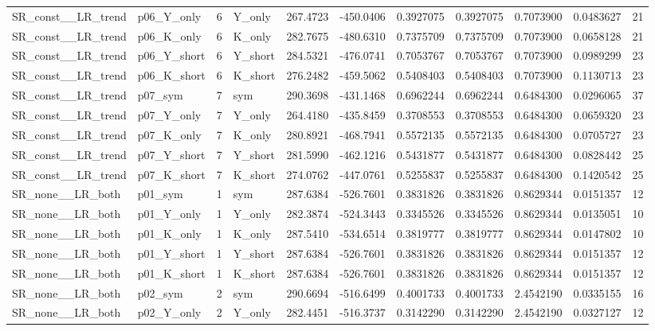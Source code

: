 \begin{table}[!h]
\begin{tabular}[t]{llrlrrrrrrr}
SR\_const\_\_LR\_trend & p06\_Y\_only & 6 & Y\_only & 267.4723 & -450.0406 & 0.3927075 & 0.3927075 & 0.7073900 & 0.0483627 & 21\\
SR\_const\_\_LR\_trend & p06\_K\_only & 6 & K\_only & 282.7675 & -480.6310 & 0.7375709 & 0.7375709 & 0.7073900 & 0.0658128 & 21\\
SR\_const\_\_LR\_trend & p06\_Y\_short & 6 & Y\_short & 284.5321 & -476.0741 & 0.7053767 & 0.7053767 & 0.7073900 & 0.0989299 & 23\\
SR\_const\_\_LR\_trend & p06\_K\_short & 6 & K\_short & 276.2482 & -459.5062 & 0.5408403 & 0.5408403 & 0.7073900 & 0.1130713 & 23\\
\addlinespace
SR\_const\_\_LR\_trend & p07\_sym & 7 & sym & 290.3698 & -431.1468 & 0.6962244 & 0.6962244 & 0.6484300 & 0.0296065 & 37\\
SR\_const\_\_LR\_trend & p07\_Y\_only & 7 & Y\_only & 264.4180 & -435.8459 & 0.3708553 & 0.3708553 & 0.6484300 & 0.0659320 & 23\\
SR\_const\_\_LR\_trend & p07\_K\_only & 7 & K\_only & 280.8921 & -468.7941 & 0.5572135 & 0.5572135 & 0.6484300 & 0.0705727 & 23\\
SR\_const\_\_LR\_trend & p07\_Y\_short & 7 & Y\_short & 281.5990 & -462.1216 & 0.5431877 & 0.5431877 & 0.6484300 & 0.0828442 & 25\\
SR\_const\_\_LR\_trend & p07\_K\_short & 7 & K\_short & 274.0762 & -447.0761 & 0.5255837 & 0.5255837 & 0.6484300 & 0.1420542 & 25\\
\addlinespace
SR\_none\_\_LR\_both & p01\_sym & 1 & sym & 287.6384 & -526.7601 & 0.3831826 & 0.3831826 & 0.8629344 & 0.0151357 & 12\\
SR\_none\_\_LR\_both & p01\_Y\_only & 1 & Y\_only & 282.3874 & -524.3443 & 0.3345526 & 0.3345526 & 0.8629344 & 0.0135051 & 10\\
SR\_none\_\_LR\_both & p01\_K\_only & 1 & K\_only & 287.5410 & -534.6514 & 0.3819777 & 0.3819777 & 0.8629344 & 0.0147802 & 10\\
SR\_none\_\_LR\_both & p01\_Y\_short & 1 & Y\_short & 287.6384 & -526.7601 & 0.3831826 & 0.3831826 & 0.8629344 & 0.0151357 & 12\\
SR\_none\_\_LR\_both & p01\_K\_short & 1 & K\_short & 287.6384 & -526.7601 & 0.3831826 & 0.3831826 & 0.8629344 & 0.0151357 & 12\\
\addlinespace
SR\_none\_\_LR\_both & p02\_sym & 2 & sym & 290.6694 & -516.6499 & 0.4001733 & 0.4001733 & 2.4542190 & 0.0335155 & 16\\
SR\_none\_\_LR\_both & p02\_Y\_only & 2 & Y\_only & 282.4451 & -516.3737 & 0.3142290 & 0.3142290 & 2.4542190 & 0.0327127 & 12\\

\end{tabular}
\end{table}
